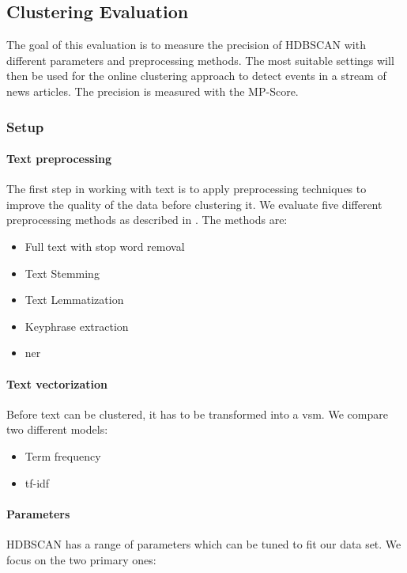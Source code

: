 \subsection{Clustering Evaluation}
\label{subsec:5a_clustering_evaluation}

The goal of this evaluation is to measure the precision of HDBSCAN with different parameters and preprocessing methods.
The most suitable settings will then be used for the online clustering approach to detect events in a stream of news articles.
The precision is measured with the MP-Score.

\subsubsection{Setup}
\label{subsubsec:5a_setup}

\paragraph{Text preprocessing}
The first step in working with text is to apply preprocessing techniques
to improve the quality of the data before clustering it.
We evaluate five different preprocessing methods as described in .
The methods are:

\begin{itemize}
    \item Full text with stop word removal
    \item Text Stemming
    \item Text Lemmatization
    \item Keyphrase extraction
    \item \Gls{ner}
\end{itemize}

\paragraph{Text vectorization}
Before text can be clustered, it has to be transformed into a \Gls{vsm}.
We compare two different models:

\begin{itemize}
    \item Term frequency
    \item tf-idf
\end{itemize}

\paragraph{Parameters}
HDBSCAN has a range of parameters which can be tuned to fit our data set.
We focus on the two primary ones:

